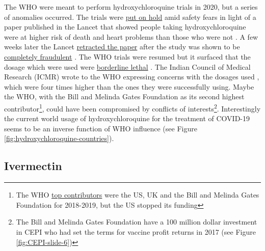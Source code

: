 \documentclass[11pt,a4paper,notitlepage]{report}
\begin{document}
The WHO were meant to perform hydroxychloroquine trials in 2020, but a series of anomalies occurred. The trials were \href{https://www.theguardian.com/world/2020/may/25/who-world-health-organization-hydroxychloroquine-trial-trump-coronavirus-safety-fears}{put on hold} amid safety fears in light of a paper published in the Lancet that showed people taking hydroxychloroquine were at higher risk of death and heart problems than those who were not \cite{guardian25052020} . A few weeks later the Lancet \href{https://www.theguardian.com/world/2020/jun/04/covid-19-lancet-retracts-paper-that-halted-hydroxychloroquine-trials}{retracted the paper} \cite{guardian03062020} after the study was shown to be \href{https://www.theguardian.com/world/2020/jun/03/covid-19-surgisphere-who-world-health-organization-hydroxychloroquine}{completely fraudulent} \cite{guardian03062020b}. The WHO trials were resumed but it surfaced that the dosage which were used were \href{https://www.francesoir.fr/politique-monde/oxford-recovery-et-solidarity-overdosage-two-clinical-trials-acts-considered}{borderline lethal} \cite{francesoir25062020}. The Indian Council of Medical Research (ICMR) wrote to the WHO expressing concerns with the dosages used \cite{newindianexpress29052020}, which were four times higher than the ones they were successfully using. Maybe the WHO, with the Bill and Melinda Gates Foundation as its second highest contributor\footnote{The WHO \href{https://www.who.int/about/funding/contributors}{top contributors} \cite{who-contributors2020} were the US, UK and the Bill and Melinda Gates Foundation for 2018-2019, but the US stopped its funding}, could have been compromised by conflicts of interests\footnote{The Bill and Melinda Gates Foundation have a 100 million dollar investment in CEPI who had set the terms for vaccine profit returns in 2017 (see Figure \ref{fig:CEPI-slide-6})}. Interestingly the current world usage of hydroxychloroquine for the treatment of COVID-19 seems to be an inverse function of WHO influence (see Figure \ref{fig:hydroxychloroquine-countries}).


\subsection*{Ivermectin}

\end{document}
